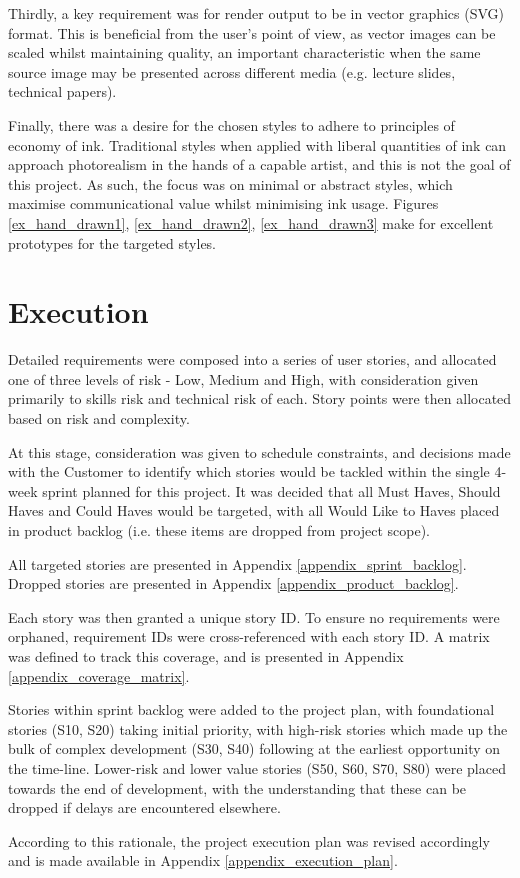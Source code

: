 Thirdly, a key requirement was for render output to be in vector graphics (SVG) format.
This is beneficial from the user's point of view, as vector images can be scaled whilst maintaining quality, an important characteristic when the same source image may be presented across different media (e.g. lecture slides, technical papers).

Finally, there was a desire for the chosen styles to adhere to principles of economy of ink.
Traditional styles when applied with liberal quantities of ink can approach photorealism in the hands of a capable artist, and this is not the goal of this project.
As such, the focus was on minimal or abstract styles, which maximise communicational value whilst minimising ink usage.
Figures \ref{ex_hand_drawn1}, \ref{ex_hand_drawn2}, \ref{ex_hand_drawn3} make for excellent prototypes for the targeted styles.

\section{Execution}\label{execution}

Detailed requirements were composed into a series of user stories, and allocated one of three levels of risk - Low, Medium and High, with consideration given primarily to skills risk and technical risk of each.
Story points were then allocated based on risk and complexity.

At this stage, consideration was given to schedule constraints, and decisions made with the Customer to identify which stories would be tackled within the single 4-week sprint planned for this project.
It was decided that all Must Haves, Should Haves and Could Haves would be targeted, with all Would Like to Haves placed in product backlog (i.e. these items are dropped from project scope).

All targeted stories are presented in Appendix \ref{appendix_sprint_backlog}. Dropped stories are presented in Appendix \ref{appendix_product_backlog}.

Each story was then granted a unique story ID. To ensure no requirements were orphaned, requirement IDs were cross-referenced with each story ID. 
A matrix was defined to track this coverage, and is presented in Appendix \ref{appendix_coverage_matrix}.

Stories within sprint backlog were added to the project plan, with foundational stories (S10, S20) taking initial priority, with high-risk stories which made up the bulk of complex development (S30, S40) following at the earliest opportunity on the time-line. 
Lower-risk and lower value stories (S50, S60, S70, S80) were placed towards the end of development, with the understanding that these can be dropped if delays are encountered elsewhere.

According to this rationale, the project execution plan was revised accordingly and is made available in Appendix \ref{appendix_execution_plan}.


